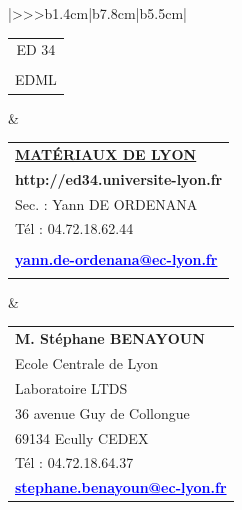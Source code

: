 \begin{center}
\begin{tabular}{|>{\centering}>{}>{\color{txtED}}b{1.4cm}|b{7.8cm}|b{5.5cm}|}
\hline	
	\begin{tabular}{@{}c@{}}
		ED 34\\
		\\
		EDML\end{tabular}&
	\begin{tabular}{@{}l@{}}
		\\
		\textbf{\underline{MATÉRIAUX DE LYON}}\\[.2cm]
		\textcolor{siteED}{\textbf{http://ed34.universite-lyon.fr}}\\
		Sec. : Yann DE ORDENANA\\
		Tél : 04.72.18.62.44\\
		\\
		\textcolor{blue}{\underline{\textbf{yann.de-ordenana@ec-lyon.fr}}}\\
		\\
	\end{tabular}&
	\begin{tabular}{@{}l@{}}
		\textcolor{txtED}{\textbf{M. Stéphane BENAYOUN}}\\
		Ecole Centrale de Lyon\\
		Laboratoire LTDS\\
		36 avenue Guy de Collongue\\
		69134 Ecully CEDEX\\
		Tél : 04.72.18.64.37\\ 
		\textcolor{blue}{\underline{\textbf{stephane.benayoun@ec-lyon.fr}}}\\
	\end{tabular}\\
		

\end{tabular}
\end{center}
